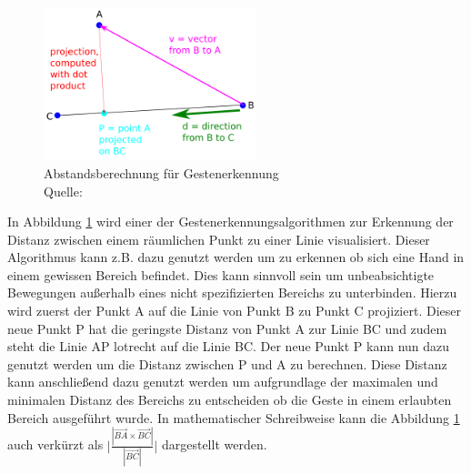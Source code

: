\begin{figure}[htb]
	\centering
	\includegraphics[width=0.55\textwidth]{images/loesungsweg/perpendicular_distance_illustration}
	\caption[Abstandsberechnung für Gestenerkennung]{Abstandsberechnung für Gestenerkennung
	\\Quelle: \cite{geometry_perpendicular_distance_nodate}}
	\label{fig:perpendicular_distance_illustration}
\end{figure}
\FloatBarrier

In Abbildung \ref{fig:perpendicular_distance_illustration} wird einer der Gestenerkennungsalgorithmen zur Erkennung der Distanz zwischen einem räumlichen Punkt zu einer Linie visualisiert. Dieser Algorithmus kann z.B. dazu genutzt werden um zu erkennen ob sich eine Hand in einem gewissen Bereich befindet. Dies kann sinnvoll sein um unbeabsichtigte Bewegungen außerhalb eines nicht spezifizierten Bereichs zu unterbinden. Hierzu wird zuerst der Punkt A auf die Linie von Punkt B zu Punkt C projiziert. Dieser neue Punkt P hat die geringste Distanz von Punkt A zur Linie BC und zudem steht die Linie AP lotrecht auf die Linie BC. Der neue Punkt P kann nun dazu genutzt werden um die Distanz zwischen P und A zu berechnen. Diese Distanz kann anschließend dazu genutzt werden um aufgrundlage der maximalen und minimalen Distanz des Bereichs zu entscheiden ob die Geste in einem erlaubten Bereich ausgeführt wurde. In mathematischer Schreibweise kann die Abbildung \ref{fig:perpendicular_distance_illustration} auch verkürzt als $\biggl| \frac{| \overrightarrow{BA} \times \overrightarrow{BC} |}{| \overrightarrow{BC} |} \biggl|$ dargestellt werden.

